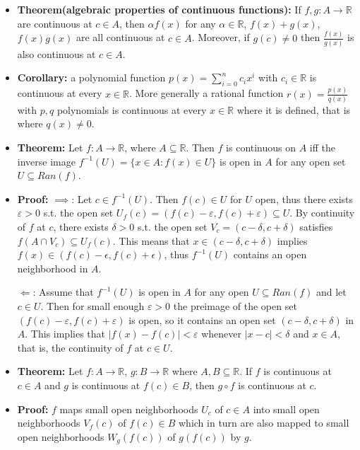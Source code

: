 \documentclass{article}
\begin{document}
\begin{itemize}
\item \textbf{Theorem(algebraic properties of continuous functions):} If $f, g: A \to \mathbb{R}$ are continuous at $c \in A$, then $\alpha f(x)$ for any $\alpha \in \mathbb{R}$, $f(x) + g(x)$, $f(x)g(x)$ are all continuous at $c \in A$. Moreover, if $g(c) \neq 0$ then $\frac{f(x)}{g(x)}$ is also continuous at $c \in A$.

\item \textbf{Corollary:} a polynomial function $\displaystyle p(x) = \sum_{i=0}^{n} c_ix^i$ with $c_i \in \mathbb{R}$ is continuous at every $x \in \mathbb{R}$. More generally a rational function $r(x) = \frac{p(x)}{q(x)}$ with $p, q$ polynomials is continuous at every $x \in \mathbb{R}$ where it is defined, that is where $q(x) \neq 0$.

\item \textbf{Theorem:} Let $f: A \to \mathbb{R}$, where $A \subseteq \mathbb{R}$. Then $f$ is continuous on $A$ iff the inverse image $f^{-1}(U) = \{x \in A: f(x) \in U\}$ is open in $A$ for any open set $U \subseteq Ran(f)$.

\item \textbf{Proof:} $\implies$: Let $c \in f^{-1}(U)$. Then $f(c) \in U$ for $U$ open, thus there exists $\varepsilon > 0$ s.t. the open set $U_f(c) = (f(c) - \varepsilon, f(c) + \varepsilon) \subseteq U$. By continuity of $f$ at $c$, there exists $\delta > 0$ s.t. the open set $V_c = (c - \delta, c + \delta)$ satisfies $f(A \cap V_c) \subseteq U_f(c)$. This means that $x \in (c - \delta, c + \delta)$ implies $f(x) \in (f(c) - \epsilon, f(c) + \epsilon)$, thus $f^{-1}(U)$ contains an open neighborhood in $A$.

$\Longleftarrow$: Assume that $f^{-1}(U)$ is open in $A$ for any open $U \subseteq Ran(f)$ and let $c \in U$. Then for small enough $\varepsilon > 0$ the preimage of the open set $(f(c) - \varepsilon, f(c) + \varepsilon)$ is open, so it contains an open set $(c - \delta, c + \delta)$ in $A$. This implies that $|f(x) - f(c)| < \varepsilon$ whenever $|x - c| < \delta$ and $x \in A$, that is, the continuity of $f$ at $c \in U$.

\item \textbf{Theorem:} Let $f: A \to \mathbb{R}$, $g: B \to \mathbb{R}$ where $A, B \subseteq \mathbb{R}$. If $f$ is continuous at $c \in A$ and $g$ is continuous at $f(c) \in B$, then $g \circ f$ is continuous at $c$.

\item \textbf{Proof:} $f$ maps small open neighborhoods $U_c$ of $c \in A$ into small open neighborhoods $V_f(c)$ of $f(c) \in B$ which in turn are also mapped to small open neighborhoods $W_g(f(c))$ of $g(f(c))$ by $g$.


\end{itemize}
\end{document}
